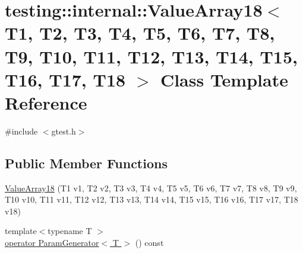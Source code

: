 \hypertarget{classtesting_1_1internal_1_1_value_array18}{\section{testing\-:\-:internal\-:\-:Value\-Array18$<$ T1, T2, T3, T4, T5, T6, T7, T8, T9, T10, T11, T12, T13, T14, T15, T16, T17, T18 $>$ Class Template Reference}
\label{classtesting_1_1internal_1_1_value_array18}
}


{\ttfamily \#include $<$gtest.\-h$>$}

\subsection*{Public Member Functions}
\begin{DoxyCompactItemize}
\item 
\hyperlink{classtesting_1_1internal_1_1_value_array18_adf8554745ebde65aba76a7bc6c1a5a06}{Value\-Array18} (T1 v1, T2 v2, T3 v3, T4 v4, T5 v5, T6 v6, T7 v7, T8 v8, T9 v9, T10 v10, T11 v11, T12 v12, T13 v13, T14 v14, T15 v15, T16 v16, T17 v17, T18 v18)
\item 
{\footnotesize template$<$typename T $>$ }\\\hyperlink{classtesting_1_1internal_1_1_value_array18_ac80cbea7e01aa101b14603c7c0766955}{operator Param\-Generator$<$ T $>$} () const 
\end{DoxyCompactItemize}


